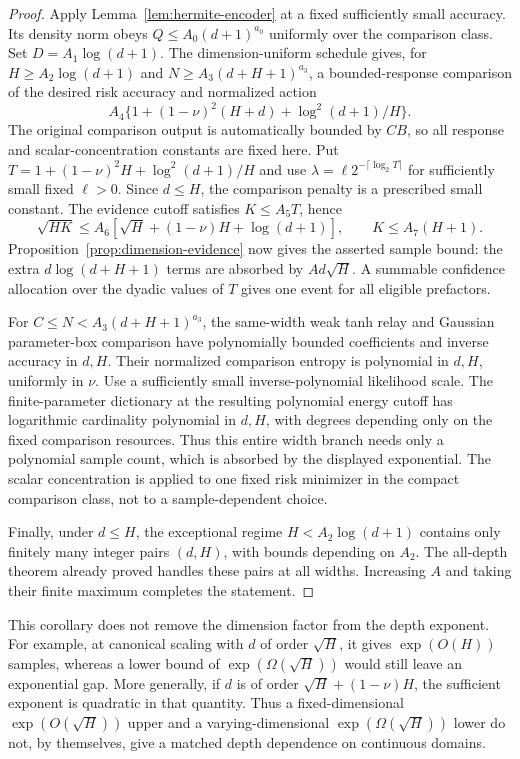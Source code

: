 \begin{proof}
Apply Lemma~\ref{lem:hermite-encoder} at a fixed sufficiently small
accuracy. Its density norm obeys $Q\le A_0(d+1)^{a_0}$ uniformly
over the comparison class. Set $D=A_1\log(d+1)$. The dimension-uniform
schedule gives, for $H\ge A_2\log(d+1)$ and
$N\ge A_3(d+H+1)^{a_3}$, a bounded-response comparison of the desired
risk accuracy and normalized action
\[
 A_4\{1+(1-\nu)^2(H+d)+\log^2(d+1)/H\}.
\]
The original comparison output is automatically bounded by $CB$, so
all response and scalar-concentration constants are fixed here. Put
$T=1+(1-\nu)^2H+\log^2(d+1)/H$ and use
$\lambda=\ell2^{-\lceil\log_2T\rceil}$ for sufficiently small fixed
$\ell>0$. Since $d\le H$, the comparison penalty is a prescribed
small constant. The evidence cutoff satisfies $K\le A_5T$, hence
\[
 \sqrt{HK}\le A_6[\sqrt H+(1-\nu)H+\log(d+1)],
 \qquad K\le A_7(H+1).
\]
Proposition~\ref{prop:dimension-evidence} now gives the asserted
sample bound: the extra $d\log(d+H+1)$ terms are absorbed by
$A d\sqrt H$. A summable confidence allocation over the dyadic
values of $T$ gives one event for all eligible prefactors.

For $C\le N<A_3(d+H+1)^{a_3}$, the same-width weak tanh relay and
Gaussian parameter-box comparison have polynomially bounded
coefficients and inverse accuracy in $d,H$. Their normalized
comparison entropy is polynomial in $d,H$, uniformly in $\nu$.
Use a sufficiently small inverse-polynomial likelihood scale. The
finite-parameter dictionary at the resulting polynomial energy
cutoff has logarithmic cardinality polynomial in $d,H$, with degrees
depending only on the fixed comparison resources. Thus this entire
width branch needs only a polynomial sample count, which is absorbed
by the displayed exponential. The scalar concentration is applied to
one fixed risk minimizer in the compact comparison class, not to a
sample-dependent choice.

Finally, under $d\le H$, the exceptional regime
$H<A_2\log(d+1)$ contains only finitely many integer pairs $(d,H)$,
with bounds depending on $A_2$. The all-depth theorem already proved
handles these pairs at all widths. Increasing $A$ and taking their
finite maximum completes the statement.
\end{proof}

This corollary does not remove the dimension factor from the depth
exponent. For example, at canonical scaling with $d$ of order
$\sqrt H$, it gives $\exp(O(H))$ samples, whereas a lower bound of
$\exp(\Omega(\sqrt H))$ would still leave an exponential gap. More
generally, if $d$ is of order $\sqrt H+(1-\nu)H$, the sufficient
exponent is quadratic in that quantity. Thus a fixed-dimensional
$\exp(O(\sqrt H))$ upper and a varying-dimensional
$\exp(\Omega(\sqrt H))$ lower do not, by themselves, give a matched
depth dependence on continuous domains.
